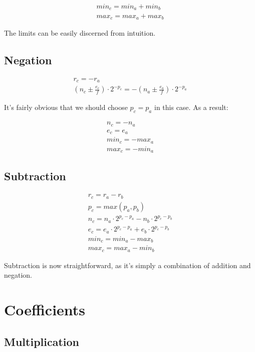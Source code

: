 \documentclass[10pt,a4paper]{article}
\numberwithin{equation}{section}
\numberwithin{equation}{subsection}
\begin{document}
	\begin{eqnarray}
	min_c = min_a + min_b \\
	max_c = max_a + max_b
	\end{eqnarray}
	
	The limits can be easily discerned from intuition.
	
	\subsection{Negation}
	
	\begin{eqnarray}
	r_c = -r_a \\
	(n_c \pm \frac{e_c}{f})\cdot 2^{-p_c} = -(n_a \pm \frac{e_a}{f})\cdot 2^{-p_a}
	\end{eqnarray}
	
	It's fairly obvious that we should choose $p_c = p_a$ in this case. As a result:
	
	\begin{eqnarray}
		n_c = -n_a \\
		e_c = e_a \\
		min_c = -max_a \\
		max_c = -min_a
	\end{eqnarray}
	
	\subsection{Subtraction}
	
	\begin{eqnarray}
		r_c = r_a - r_b \\
		p_c = max(p_a, p_b) \\
		n_c = n_a\cdot 2^{p_c-p_a} - n_b\cdot 2^{p_c-p_b} \\
		e_c = e_a\cdot 2^{p_c-p_a} + e_b\cdot 2^{p_c-p_b} \\
		min_c = min_a - max_b \\
		max_c = max_a - min_b
	\end{eqnarray}
	
	Subtraction is now straightforward, as it's simply a combination of addition and negation.
	
	\section{Coefficients}
	
	\subsection{Multiplication}
	
\end{document}
